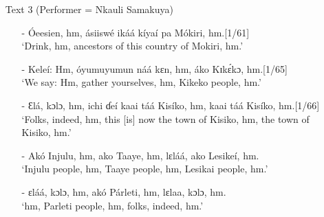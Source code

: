 \documentclass[output=paper,colorlinks,citecolor=brown]{langscibook}
\begin{document}


\begin{enumerate}
    \item[]     Text 3 (Performer = Nkauli Samakuya)
    \begin{enumerate}
        \item[-]    Óeesien, hm, ásiiswé ikáá kíyaí pa Mókiri, hm.\hfill [1/61]\\
                    `Drink, hm, ancestors of this country of Mokiri, hm.'
        \item[-]    Keleí: Hm, óyumuyumun náá kɛn, hm, áko Kɪkɛ́kɔ, hm.\hfill [1/65]\\
                    `We say: Hm, gather yourselves, hm, Kikeko people, hm.'
        \item[-]    Ɛlá, kɔlɔ, hm, ichi ɗeí kaai táá Kisíko, hm, kaai táá Kisíko, hm.\hfill [1/66]\\
                    `Folks, indeed, hm, this [is] now the town of Kisiko, hm, the town of Kisiko, hm.'
        \item[-]    Akó Injulu, hm, ako Taaye, hm, lɛláá, ako Lesikeí, hm.\\
                    `Injulu people, hm, Taaye people, hm, Lesikai people, hm.'
        \item[-]    ɛláá, kɔlɔ, hm, akó Párleti, hm, lɛlaa, kɔlɔ, hm.\\
                    `hm, Parleti people, hm, folks, indeed, hm.'
    \end{enumerate}
\end{enumerate}
\end{document}
